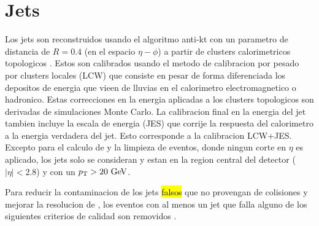 \section{Jets}
\label{sec:jet_obj}

Los jets son reconstruidos usando el algoritmo anti-kt \cite{Cacciari:2008gp} con
un parametro de distancia de $R = 0.4$  (en el espacio $\eta - \phi$) a partir
de clusters calorimetricos topologicos \cite{Lampl:1099735}.
Estos son calibrados usando el metodo de calibracion por pesado por clusters locales (LCW)
que consiste en pesar de forma diferenciada los depositos de energia que vieen de lluvias en
el calorimetro electromagnetico o hadronico.
Estas correcciones en la energia aplicadas a los clusters topologicos son derivadas de
simulaciones Monte Carlo. La calibracion final en la energia del jet tambien incluye la escala
de energia (JES) que corrije la respuesta del calorimetro a la energia verdadera del jet.
Esto corresponde a la calibracion LCW+JES.
Excepto para el calculo de {\met} y la limpieza de eventos, donde ningun corte en $\eta$ es
aplicado, los jets solo se consideran y estan en la region central del detector ($|\eta|<2.8$)
y con un $\pt > 20\gev$.

Para reducir la contaminacion de los jets \hl{falsos} que no provengan de colisiones y mejorar
la resolucion de {\met}, los eventos con al menos un jet que falla alguno de los siguientes
criterios  de calidad son removidos \cite{JetCleaning}.

